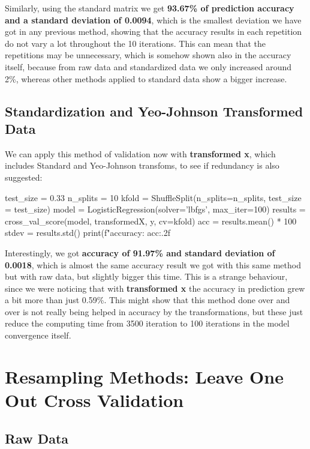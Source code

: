 \documentclass[11pt]{article}
\begin{document}
Similarly, using the standard matrix we get \textbf{93.67\% of prediction accuracy and a standard deviation of 0.0094}, which is the smallest deviation we have got in any previous method, showing that the accuracy results in each repetition do not vary a lot throughout the 10 iterations. This can mean that the repetitions may be unnecessary, which is somehow shown also in the accuracy itself, because from raw data and standardized data we only increased around 2\%, whereas other methods applied to standard data show a bigger increase.

\subsection{Standardization and Yeo-Johnson Transformed Data}

We can apply this method of validation now with \textbf{transformed x}, which includes Standard and Yeo-Johnson transfoms, to see if redundancy is also suggested:
\\

\begin{python}
test_size = 0.33
n_splits = 10
kfold = ShuffleSplit(n_splits=n_splits, test_size = test_size)
model = LogisticRegression(solver='lbfgs', max_iter=100)
results = cross_val_score(model, transformedX, y, cv=kfold)
acc = results.mean() * 100
stdev = results.std()
print(f"accuracy: {acc:.2f}%
\end{python}

Interestingly, we got \textbf{accuracy of 91.97\% and standard deviation of 0.0018}, which is almost the same accuracy result we got with this same method but with raw data, but slightly bigger this time. This is a strange behaviour, since we were noticing that with \textbf{transformed x} the accuracy in prediction grew a bit more than just 0.59\%. This might show that this method done over and over is not really being helped in accuracy by the transformations, but these just reduce the computing time from 3500 iteration to 100 iterations in the model convergence itself.

\section{Resampling Methods: Leave One Out Cross Validation}

\subsection{Raw Data}
\end{document}
